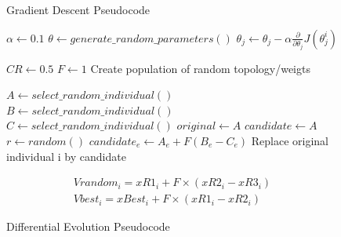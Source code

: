 \documentclass[a4paper,12pt, oneside]{memoir}
\begin{document}
\begin{figure}
  \vspace{-5pt}
  \setlength{\columnsep}{20pt}
  \begin{minipage}[H]{0.45\textwidth}

    \begin{algorithm}[H]\small
    \caption{Gradient Descent Pseudocode}\label{pseudocode-gradient-descent}
      \begin{algorithmic}[1]
        \State $\alpha \gets 0.1$
        \State $\theta \gets generate\_random\_parameters()$
        \Repeat
          \State $\theta_{j} \gets \theta_{j} - \alpha \frac{\partial }{\partial \theta_{j}} J(\theta_{j}^{i})$ 
      \end{algorithmic}
    \end{algorithm}
    \vspace{-5pt}
  \end{minipage}

  \hfill
  
  \begin{minipage}[H]{0.45\textwidth}
    \begin{algorithm}[H]\small
      \caption{Differential Evolution Pseudocode}\label{pseudocode-differential-evolution}
      \begin{algorithmic}[1]
        \State $CR \gets 0.5$\Comment{[0,1]}
        \State $F \gets 1$\Comment{[0,2]}
        \State Create population of random topology/weigts
        
        \Repeat
            \State $A \gets select\_random\_individual() $
            \State $B \gets select\_random\_individual() $
            \State $C \gets select\_random\_individual() $
            \State $original  \gets A $
            \State $candidate \gets A $
              \State $r \gets random()$\Comment{[0,1]}
                \State $candidate_e \gets A_e + F (B_e - C_e)$
              \EndIf
            \EndFor
              \State Replace original individual i by candidate
            \EndIf
          \EndFor 
      \end{algorithmic}
    \end{algorithm}
    \hfill
    \begin{align} \label{equations:mutation-schemes}
      Vrandom_i = xR1_i + F\times(xR2_i - xR3_i) \\
      Vbest_i = xBest_i + F\times(xR1_i - xR2_i)
    \end{align}
  
  \end{minipage}
  \vspace{-80pt}
\end{figure}
\hfill
\end{document}

